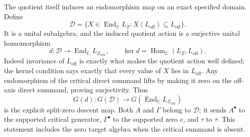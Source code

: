 The quotient itself induces an endomorphism map on an exact specified
domain.  Define
\[
 \mathcal D=\{X\in\operatorname{End}_{\mathbb C}L_Z:
                      X(L_{\mathrm{off}})\subseteq L_{\mathrm{off}}\}.
\]
It is a unital subalgebra, and the induced quotient action is a
surjective unital homomorphism
\[
 d:\mathcal D\longrightarrow\operatorname{End}_{\mathbb C}
                         L_{Z_{\mathrm{crit}}},\qquad
 \ker d=\operatorname{Hom}_{\mathbb C}(L_Z,L_{\mathrm{off}}).
\]
Indeed invariance of $L_{\mathrm{off}}$ is exactly what makes the quotient
action well defined; the kernel condition says exactly that every value
of $X$ lies in $L_{\mathrm{off}}$.  Any endomorphism of the critical
direct summand lifts by making it zero on the off-axis direct summand,
proving surjectivity.  Thus
\[
 G(d):G(\mathcal D)\longrightarrow
 G(\operatorname{End}_{\mathbb C}L_{Z_{\mathrm{crit}}})
\]
is the explicit split-zero descent map.  Both $A$ and $\Gamma$ belong to
$\mathcal D$; it sends $A^\bullet$ to the supported critical generator,
$\Gamma^\bullet$ to the supported zero $e$, and $\tau$ to $\tau$.
This statement includes the zero target algebra when the critical
summand is absent.
